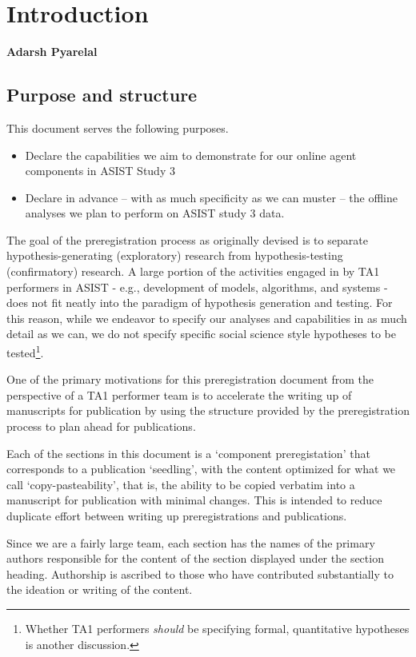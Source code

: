 \chapter{Introduction}
\textbf{Adarsh Pyarelal}

\section{Purpose and structure}

This document serves the following purposes.

\begin{itemize}
    \item Declare the capabilities we aim to demonstrate for our online agent
        components in ASIST Study 3
    \item Declare in advance -- with as much specificity as we can muster --
        the offline analyses we plan to perform on ASIST study 3 data.
\end{itemize}


The goal of the preregistration process as originally devised
\citep{Nosek.ea:2018} is to separate hypothesis-generating (exploratory)
research from hypothesis-testing (confirmatory) research. A large portion of
the activities engaged in by TA1 performers in ASIST - e.g., development of
models, algorithms, and systems - does not fit neatly into the paradigm of
hypothesis generation and testing.  For this reason, while we endeavor to
specify our analyses and capabilities in as much detail as we can, we do not
specify specific social science style hypotheses to be tested\footnote{Whether
TA1 performers \emph{should} be specifying formal, quantitative hypotheses is
another discussion.}.

One of the primary motivations for this preregistration document from the
perspective of a TA1 performer team is to accelerate the writing up of
manuscripts for publication by using the structure provided by the
preregistration process to plan ahead for publications.

Each of the sections in this document is a `component preregistation' that
corresponds to a publication `seedling', with the content optimized for what we
call `copy-pasteability', that is, the ability to be copied verbatim into a
manuscript for publication with minimal changes. This is intended to reduce
duplicate effort between writing up preregistrations and publications.

Since we are a fairly large team, each section has the names of the primary
authors responsible for the content of the section displayed under the section
heading. Authorship is ascribed to those who have contributed substantially to
the ideation or writing of the content.

